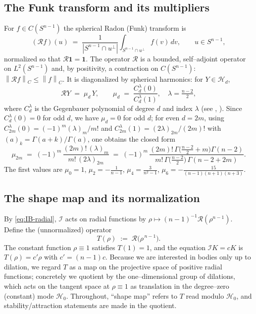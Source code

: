 \documentclass[11pt,reqno]{amsart}
\theoremstyle{plain}
\theoremstyle{definition}
\newcommand{\Sph}{S^{n-1}}
\newcommand{\Rad}{\mathcal{R}}
\newcommand{\IB}{\mathcal{I}}
\newcommand{\Hd}[1]{\mathcal{H}_{#1}}
\newcommand{\norm}[1]{\left\lVert #1 \right\rVert}
\newcommand{\abs}[1]{\left\lvert #1 \right\rvert}
\begin{document}
\subsection{The Funk transform and its multipliers}
For $f\in C(\Sph)$ the spherical Radon (Funk) transform is
\[
   (\Rad f)(u)\;=\;\frac{1}{\abs{\Sph\cap u^{\perp}}}
   \int_{\Sph\cap u^{\perp}} f(v)\,dv,\qquad u\in\Sph,
\]
normalized so that $\Rad\mathbf 1=\mathbf 1$. The operator $\Rad$ is a bounded,
self--adjoint operator on $L^2(\Sph)$ and, by positivity, a contraction on
$C(\Sph)$: $\norm{\Rad f}_{C}\le\norm{f}_{C}$. It is diagonalized by spherical
harmonics: for $Y\in\Hd d$,
\begin{equation}\label{eq:funk-eig}
   \Rad Y \;=\; \mu_d\, Y,\qquad
   \mu_d \;=\; \frac{C_d^{\lambda}(0)}{C_d^{\lambda}(1)},\quad \lambda=\tfrac{n-2}{2},
\end{equation}
where $C_d^{\lambda}$ is the Gegenbauer polynomial of degree $d$ and index
$\lambda$ (see \cite[Ch.~3]{Koldobsky2005}, \cite{Rubin2002}). Since
$C_d^\lambda(0)=0$ for odd $d$, we have $\mu_d=0$ for odd $d$; for even
$d=2m$, using $C_{2m}^\lambda(0)=(-1)^m (\lambda)_m/m!$ and
$C_{2m}^\lambda(1)=(2\lambda)_{2m}/(2m)!$ with $(a)_k=\Gamma(a+k)/\Gamma(a)$,
one obtains the closed form
\begin{equation}\label{eq:mu2m}
   \mu_{2m}\;=\;(-1)^m\,\frac{(2m)!\,(\lambda)_m}{m!\,(2\lambda)_{2m}}
   \;=\;(-1)^m\,\frac{(2m)!\,\Gamma\!\big(\tfrac{n-2}{2}+m\big)\Gamma(n-2)}
   {m!\,\Gamma\!\big(\tfrac{n-2}{2}\big)\,\Gamma(n-2+2m)} .
\end{equation}
The first values are $\mu_0=1$, $\mu_2=-\tfrac{1}{n-1}$,
$\mu_4=\tfrac{3}{n^2-1}$, $\mu_6=-\tfrac{15}{(n-1)(n+1)(n+3)}$.

\subsection{The shape map and its normalization}
By \eqref{eq:IB-radial}, $\IB$ acts on radial functions by
$\rho\mapsto (n-1)^{-1}\Rad(\rho^{n-1})$. Define the (unnormalized) operator
\[
   T(\rho)\;:=\;\Rad\big(\rho^{\,n-1}\big).
\]
The constant function $\rho\equiv 1$ satisfies $T(1)=1$, and the equation
$\IB K = cK$ is $T(\rho)=c'\rho$ with $c'=(n-1)c$. Because we are interested in
bodies only up to dilation, we regard $T$ as a map on the projective space of
positive radial functions; concretely we quotient by the one--dimensional
group of dilations, which acts on the tangent space at $\rho\equiv1$ as
translation in the degree--zero (constant) mode $\Hd 0$. Throughout, ``shape
map'' refers to $T$ read modulo $\Hd 0$, and stability/attraction statements
are made in the quotient.
\end{document}
